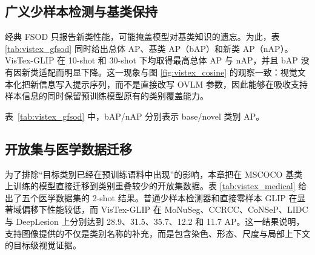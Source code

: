 \subsection{广义少样本检测与基类保持}
经典 FSOD 只报告新类性能，可能掩盖模型对基类知识的遗忘。为此，表 \ref{tab:vistex_gfsod} 同时给出总体 AP、基类 AP（bAP）和新类 AP（nAP）。VisTex-GLIP 在 10-shot 和 30-shot 下均取得最高总体 AP 与 nAP，并且 bAP 没有因新类适配而明显下降。这一现象与图 \ref{fig:vistex_cosine} 的观察一致：视觉文本化把新信息写入提示序列，而不是直接改写 OVLM 参数，因此能够在吸收支持样本信息的同时保留预训练模型原有的类别覆盖能力。

\begin{table}[t]
    \centering
    \caption{MSCOCO 广义少样本检测结果}
    \label{tab:vistex_gfsod}
\end{table}
表~\ref{tab:vistex_gfsod} 中，bAP/nAP 分别表示 base/novel 类别 AP。


\subsection{开放集与医学数据迁移}
为了排除“目标类别已经在预训练语料中出现”的影响，本章把在 MSCOCO 基类上训练的模型直接迁移到类别重叠较少的开放集数据。表 \ref{tab:vistex_medical} 给出了五个医学数据集的 2-shot 结果。普通少样本检测器和直接零样本 GLIP 在显著域偏移下性能较低，而 VisTex-GLIP 在 MoNuSeg、CCRCC、CoNSeP、LIDC 与 DeepLesion 上分别达到 28.9、31.5、35.7、12.2 和 11.7 AP。这一结果说明，支持图像提供的不仅是类别名称的补充，而是包含染色、形态、尺度与局部上下文的目标级视觉证据。

